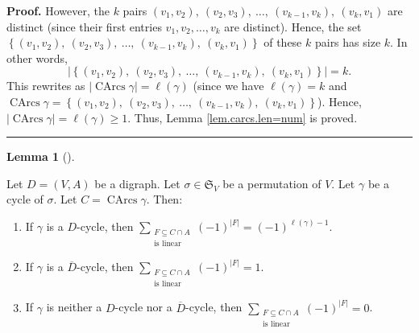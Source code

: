 \documentclass[numbers=enddot,12pt,final,onecolumn,notitlepage]{scrartcl}%
\numberwithin{exer}{section}
\theoremstyle{definition}
\newtheorem{lem}[theo]{Lemma}
\newenvironment{lemma}[1][]
{\begin{lem}[#1]\begin{leftbar}}
{\end{leftbar}\end{lem}}
\newenvironment{proof}[1][Proof]{\noindent\textbf{#1.} }{\ \rule{0.5em}{0.5em}}
\let\sumnonlimits\sum
\renewcommand{\sum}{\sumnonlimits\limits}
\newenvironment{verlong}{}{}
\begin{document}
\begin{verlong}
\begin{proof}
However, the $k$ pairs $\left(  v_{1},v_{2}\right)  ,\ \left(  v_{2}%
,v_{3}\right)  ,\ \ldots,\ \left(  v_{k-1},v_{k}\right)  ,\ \left(
v_{k},v_{1}\right)  $ are distinct (since their first entries $v_{1}%
,v_{2},\ldots,v_{k}$ are distinct). Hence, the set \newline$\left\{  \left(
v_{1},v_{2}\right)  ,\ \left(  v_{2},v_{3}\right)  ,\ \ldots,\ \left(
v_{k-1},v_{k}\right)  ,\ \left(  v_{k},v_{1}\right)  \right\}  $ of these $k$
pairs has size $k$. In other words,%
\[
\left\vert \left\{  \left(  v_{1},v_{2}\right)  ,\ \left(  v_{2},v_{3}\right)
,\ \ldots,\ \left(  v_{k-1},v_{k}\right)  ,\ \left(  v_{k},v_{1}\right)
\right\}  \right\vert =k.
\]
This rewrites as $\left\vert \operatorname*{CArcs}\gamma\right\vert
=\ell\left(  \gamma\right)  $ (since we have $\ell\left(  \gamma\right)  =k$
and \newline$\operatorname*{CArcs}\gamma=\left\{  \left(  v_{1},v_{2}\right)
,\ \left(  v_{2},v_{3}\right)  ,\ \ldots,\ \left(  v_{k-1},v_{k}\right)
,\ \left(  v_{k},v_{1}\right)  \right\}  $). Hence, $\left\vert
\operatorname*{CArcs}\gamma\right\vert =\ell\left(  \gamma\right)  \geq1$.
Thus, Lemma \ref{lem.carcs.len=num} is proved.
\end{proof}

\begin{lemma}
\label{lem.carcs.linear2}Let $D=\left(  V,A\right)  $ be a digraph. Let
$\sigma\in\mathfrak{S}_{V}$ be a permutation of $V$. Let $\gamma$ be a cycle
of $\sigma$. Let $C=\operatorname*{CArcs}\gamma$. Then:

\begin{enumerate}
\item[\textbf{(a)}] If $\gamma$ is a $D$-cycle, then $\sum
_{\substack{F\subseteq C\cap A\\\text{is linear}}}\left(  -1\right)
^{\left\vert F\right\vert }=\left(  -1\right)  ^{\ell\left(  \gamma\right)
-1}$.

\item[\textbf{(b)}] If $\gamma$ is a $\overline{D}$-cycle, then $\sum
_{\substack{F\subseteq C\cap A\\\text{is linear}}}\left(  -1\right)
^{\left\vert F\right\vert }=1$.

\item[\textbf{(c)}] If $\gamma$ is neither a $D$-cycle nor a $\overline{D}%
$-cycle, then $\sum_{\substack{F\subseteq C\cap A\\\text{is linear}}}\left(
-1\right)  ^{\left\vert F\right\vert }=0$.
\end{enumerate}
\end{lemma}


\end{verlong}
\end{document}
